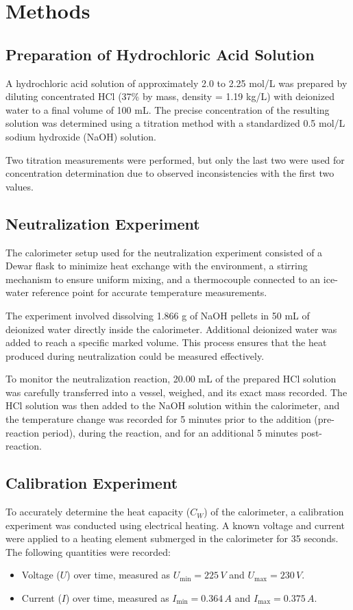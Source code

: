 \documentclass[a4paper,12pt]{article}
\begin{document}
\section{Methods}
\subsection{Preparation of Hydrochloric Acid Solution}
A hydrochloric acid solution of approximately 2.0 to 2.25 mol/L was prepared by diluting concentrated HCl (37\% by mass, density = 1.19 kg/L) with deionized water to a final volume of 100 mL. The precise concentration of the resulting solution was determined using a titration method with a standardized 0.5 mol/L sodium hydroxide (NaOH) solution. 

Two titration measurements were performed, but only the last two were used for concentration determination due to observed inconsistencies with the first two values.

\subsection{Neutralization Experiment}
The calorimeter setup used for the neutralization experiment consisted of a Dewar flask to minimize heat exchange with the environment, a stirring mechanism to ensure uniform mixing, and a thermocouple connected to an ice-water reference point for accurate temperature measurements.

The experiment involved dissolving 1.866 g of NaOH pellets in 50 mL of deionized water directly inside the calorimeter. Additional deionized water was added to reach a specific marked volume. This process ensures that the heat produced during neutralization could be measured effectively.

To monitor the neutralization reaction, 20.00 mL of the prepared HCl solution was carefully transferred into a vessel, weighed, and its exact mass recorded. The HCl solution was then added to the NaOH solution within the calorimeter, and the temperature change was recorded for 5 minutes prior to the addition (pre-reaction period), during the reaction, and for an additional 5 minutes post-reaction.

\subsection{Calibration Experiment}
To accurately determine the heat capacity (\(C_W\)) of the calorimeter, a calibration experiment was conducted using electrical heating. A known voltage and current were applied to a heating element submerged in the calorimeter for 35 seconds. The following quantities were recorded:
\begin{itemize}
    \item Voltage (\(U\)) over time, measured as \(U_{\text{min}} = 225 \, V\) and \(U_{\text{max}} = 230 \, V\).
    \item Current (\(I\)) over time, measured as \(I_{\text{min}} = 0.364 \, A\) and \(I_{\text{max}} = 0.375 \, A\).
\end{itemize}
\end{document}
